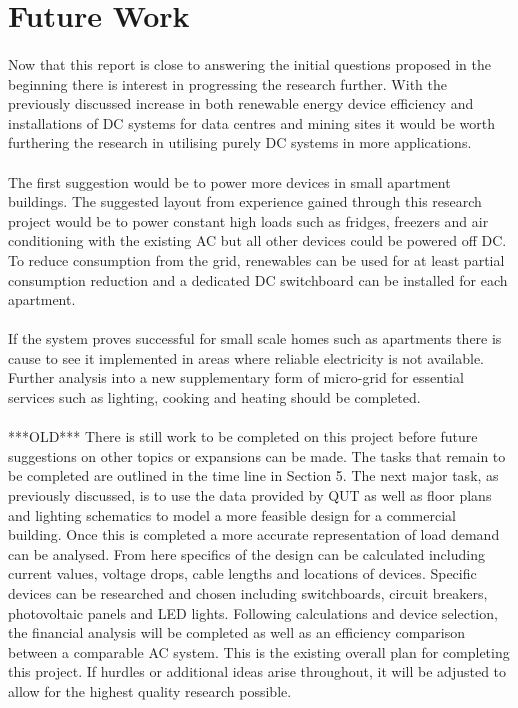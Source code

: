 \section{Future Work}

\paragraph{}
Now that this report is close to answering the initial questions proposed in the beginning there is interest in progressing the research further. With the previously discussed increase in both renewable energy device efficiency and installations of DC systems for data centres and mining sites it would be worth furthering the research in utilising purely DC systems in more applications. 

\paragraph{}
The first suggestion would be to power more devices in small apartment buildings. The suggested layout from experience gained through this research project would be to power constant high loads such as fridges, freezers and air conditioning with the existing AC but all other devices could be powered off DC. To reduce consumption from the grid, renewables can be used for at least partial consumption reduction and a dedicated DC switchboard can be installed for each apartment. 

\paragraph{}
If the system proves successful for small scale homes such as apartments there is cause to see it implemented in areas where reliable electricity is not available. Further analysis into a new supplementary form of micro-grid for essential services such as lighting, cooking and heating should be completed. 

\paragraph{}
***OLD*** 
\newline 
There is still work to be completed on this project before future suggestions on other topics or expansions can be made. The tasks that remain to be completed are outlined in the time line in Section 5. The next major task, as previously discussed, is to use the data provided by QUT as well as floor plans and lighting schematics to model a more feasible design for a commercial building. Once this is completed a more accurate representation of load demand can be analysed. From here specifics of the design can be calculated including current values, voltage drops, cable lengths and locations of devices. Specific devices can be researched and chosen including switchboards, circuit breakers, photovoltaic panels and LED lights. Following calculations and device selection, the financial analysis will be completed as well as an efficiency comparison between a comparable AC system. This is the existing overall plan for completing this project. If hurdles or additional ideas arise throughout, it will be adjusted to allow for the highest quality research possible. 

\newpage